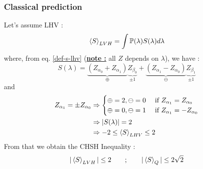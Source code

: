 \documentclass{article}
\begin{document}
\subsubsection*{Classical prediction}
Let's assume LHV :
\begin{equation}
    \braket{S}_{LVH} = \int \mathbb{P}(\lambda)S(\lambda) d\lambda
\end{equation}
where, from eq. \ref{def-s-lhv} (\underline{\textbf{note :}}  all $Z$ depends on $\lambda$), we have :
\begin{equation}
    S(\lambda)
        = \underbrace{(Z_{\alpha_0}+Z_{\alpha_1})}_{\oplus}\underbrace{Z_{\beta_0}}_{\pm 1}
        + \underbrace{(Z_{\alpha_1}-Z_{\alpha_0})}_{\ominus}\underbrace{Z_{\beta_1}}_{\pm 1}
\end{equation}
and
\begin{equation}
    \begin{aligned}
        Z_{\alpha_1} = \pm Z_{\alpha_0}
            & \Rightarrow
                \begin{cases}
                    \oplus = 2, \ominus = 0 & \text{ if } Z_{\alpha_1} = Z_{\alpha_0} \\
                    \oplus = 0, \ominus = 1 & \text{ if } Z_{\alpha_1} = - Z_{\alpha_0} \\
                \end{cases} \\
            & \Rightarrow |S(\lambda)| = 2 \\
            & \Rightarrow -2 \leq \braket{S}_{LHV} \leq 2
    \end{aligned}
\end{equation}
From that we obtain the CHSH Inequality :
\begin{equation}
    |\braket{S}_{LVH}| \leq 2 \qquad ; \qquad |\braket{S}_Q| \leq 2\sqrt2
\end{equation}
\end{document}
